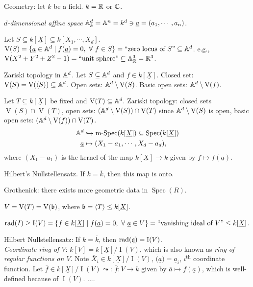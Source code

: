 \begin{remark}
    Geometry: let $k$ be a field. $k = \mathbb{R}$ or $\mathbb{C}$. \par 
    \emph{$d$-dimensional affine space} $\mathbb{A}^d_k = \mathbb{A}^n = k^d \ni \underline a = (a_1,\cdots,a_n)$. \par 
    Let $S \subseteq k[\underline X] \subseteq k[X_1,\cdots,X_d]$. $\operatorname{V}(S) = \{\underline a \in \mathbb{A}^d \mid f(\underline a) = 0,\ \forall \  f \in S\} = \text{``zero locus of $S$''} \subseteq \mathbb{A}^d$. e.g., $\operatorname{V}(X^2+Y^2+Z^2-1) = \text{``unit sphere''} \subseteq \mathbb{A}^3_{\mathbb{R}} = \mathbb{R}^3$. \par 
    Zariski topology in $\mathbb{A}^d$. Let $S \subseteq \mathbb{A}^d$ and $f \in k[\underline X]$. Closed set: $\operatorname{V}(S) = \operatorname{V}(\langle S \rangle) \subseteq \mathbb{A}^d$. Open sets: $\mathbb{A}^d \setminus \operatorname{V}(S)$. Basic open sets: $\mathbb{A}^d \setminus \operatorname{V}(f)$. \par 
    Let $T \subseteq k[\underline X]$ be fixed and $\operatorname{V}(T) \subseteq \mathbb{A}^d$. Zariski topology: closed sets $\operatorname{V}(S) \cap \operatorname{V}(T)$, open sets: $(\mathbb{A}^d \setminus \operatorname{V}(S)) \cap \operatorname{V}(T)$ since $\mathbb{A}^d \setminus \operatorname{V}(S)$ is open, basic open sets: $(\mathbb{A}^d \setminus \operatorname{V}(f)) \cap \operatorname{V}(T)$.
    \begin{align*}
        \mathbb{A}^d &\hookrightarrow \operatorname{m-Spec}(k[\underline X]) \subseteq \operatorname{Spec}(k[\underline X]) \\
        \underline a &\mapsto (X_1-a_1,\cdots,X_d-a_d), 
    \end{align*}
    where $(X_1-a_1)$ is the kernel of the map $k[\underline X] \to k$ given by $f \mapsto f(\underline a)$. \par 
    Hilbert's Nullstellensatz. If $k = \overline k$, then this map is onto. \par 
    Grothenick: there exists more geometric data in $\operatorname{Spec}(R)$. \par 
    $V = \operatorname{V}(T) = \operatorname{V}(\mathfrak{b})$, where $\mathfrak{b} = \langle T \rangle \leq k[\underline X]$. \par 
    $\operatorname{rad}(I) \geq \operatorname{I}(V) = \{f \in k[\underline X] \mid f(\underline a) = 0,\ \forall \  \underline a \in V\} = \text{``vanishing ideal of $V$''} \leq k[\underline X]$. \par 
    Hilbert Nullstellensatz: If $k = \overline k$, then $\operatorname{rad}(\mathfrak{q}) = \operatorname{I}(V)$. \\
    \emph{Coordinate ring of $V$}: $k[V] = k[\underline X]/\operatorname{I}(V)$, which is also known as \emph{ring of regular functions on $V$}. Note $\overbar X_i \in k[\underline X]/\operatorname{I}(V)$, $\overbar (\underline a) = \underline a_i$, $i^{\text{th}}$ coordinate function. Let $\overbar f \in k[\underline X]/\operatorname{I}(V) \leadsto$: $\overbar f: V \to k$ given by $\overline a \mapsto f(\underline a)$, which is well-defined because of $\operatorname{I}(V)$. $....$
\end{remark}

